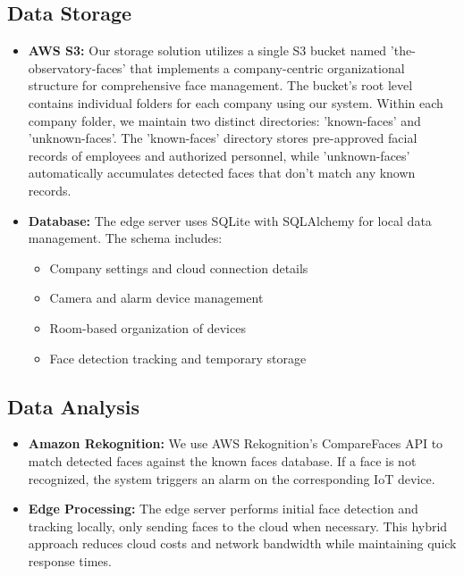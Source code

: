 \documentclass[conference]{IEEEtran}
\begin{document}
\subsection{Data Storage}
\begin{itemize}
      \item \textbf{AWS S3:} Our storage solution utilizes a single S3 bucket named 'the-observatory-faces' that implements 
            a company-centric organizational structure for comprehensive face management. The bucket's root level contains 
            individual folders for each company using our system. Within each company folder, we maintain two distinct directories: 
            'known-faces' and 'unknown-faces'. The 'known-faces' directory stores pre-approved facial records of employees and 
            authorized personnel, while 'unknown-faces' automatically accumulates detected faces that don't match any known records.
      \item \textbf{Database:} The edge server uses SQLite with SQLAlchemy for local data management. The schema includes:
            \begin{itemize}
                  \item Company settings and cloud connection details
                  \item Camera and alarm device management
                  \item Room-based organization of devices
                  \item Face detection tracking and temporary storage
            \end{itemize}
\end{itemize}

\subsection{Data Analysis}
\begin{itemize}
      \item \textbf{Amazon Rekognition:} We use AWS Rekognition's CompareFaces API to match detected faces against the known faces
            database. If a face is not recognized, the system triggers an alarm on the corresponding IoT device.
      \item \textbf{Edge Processing:} The edge server performs initial face detection and tracking locally, only sending faces to
            the cloud when necessary. This hybrid approach reduces cloud costs and network bandwidth while maintaining quick response times.
\end{itemize}
\end{document}
